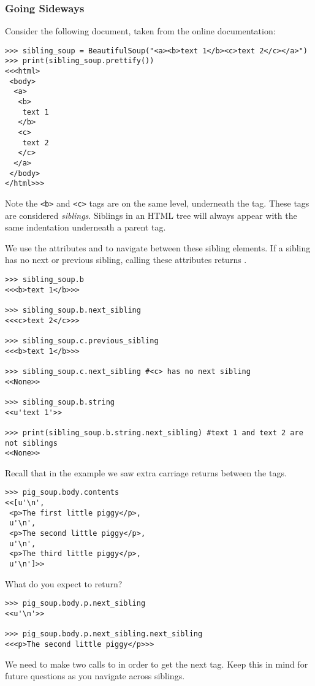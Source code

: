 \subsubsection{Going Sideways}

Consider the following document, taken from the online documentation:
\begin{lstlisting}
>>> sibling_soup = BeautifulSoup("<a><b>text 1</b><c>text 2</c></a>")
>>> print(sibling_soup.prettify())
<<<html>
 <body>
  <a>
   <b>
    text 1
   </b>
   <c>
    text 2
   </c>
  </a>
 </body>
</html>>>
\end{lstlisting}
Note the \lstinline{<b>} and \lstinline{<c>} tags are on the same level, underneath the  tag.
These tags are considered \textit{siblings}.
Siblings in an HTML tree will always appear with the same indentation underneath a parent tag.

We use the attributes  and  to navigate between these sibling elements.
If a sibling has no next or previous sibling, calling these attributes returns .

\begin{lstlisting}
>>> sibling_soup.b
<<<b>text 1</b>>>

>>> sibling_soup.b.next_sibling
<<<c>text 2</c>>>

>>> sibling_soup.c.previous_sibling
<<<b>text 1</b>>>

>>> sibling_soup.c.next_sibling #<c> has no next sibling
<<None>>

>>> sibling_soup.b.string
<<u'text 1'>>

>>> print(sibling_soup.b.string.next_sibling) #text 1 and text 2 are not siblings
<<None>>
\end{lstlisting}

Recall that in the  example we saw extra carriage returns between the  tags.
\begin{lstlisting}
>>> pig_soup.body.contents
<<[u'\n',
 <p>The first little piggy</p>,
 u'\n',
 <p>The second little piggy</p>,
 u'\n',
 <p>The third little piggy</p>,
 u'\n']>>
\end{lstlisting}
What do you expect  to return?
\begin{lstlisting}
>>> pig_soup.body.p.next_sibling
<<u'\n'>>

>>> pig_soup.body.p.next_sibling.next_sibling
<<<p>The second little piggy</p>>>
\end{lstlisting}
We need to make two calls to  in order to get the next  tag.
Keep this in mind for future questions as you navigate across siblings.

